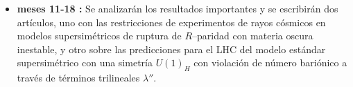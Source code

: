 \begin{itemize}
\item {\bf meses 11-18 : } Se analizarán los resultados importantes y se escribirán dos artículos, uno con las restricciones de experimentos de rayos cósmicos en modelos supersimétricos de ruptura de $R$--paridad con materia oscura inestable, y otro sobre las predicciones para el LHC del modelo estándar supersimétrico con una simetría $U(1)_H$ con violación de número bariónico a través de términos trilineales $\lambda''$.

\end{itemize}



